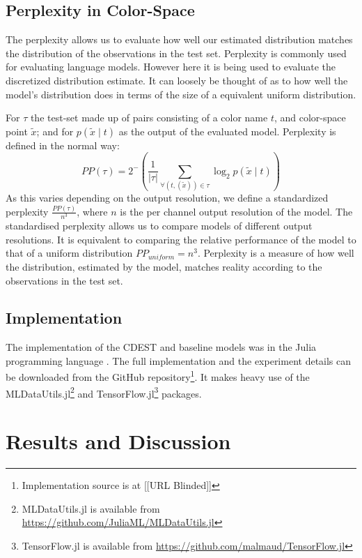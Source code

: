 \documentclass[11pt,a4paper]{article}
\newcommand{\parencite}{\citep}
\begin{document}
\subsection{Perplexity in Color-Space}
The perplexity allows us to evaluate how well our estimated distribution matches the distribution of the observations in the test set.
Perplexity is commonly used for evaluating language models. However here it is being used to evaluate the discretized distribution estimate.
It can loosely be thought of as to how well the model's distribution does in terms of the size of a equivalent uniform distribution.

For $\tau$ the test-set made up of pairs consisting of a color name $t$, and color-space point $\tilde{x}$;
and for $p(\tilde{x}\mid t)$ as the output of the evaluated model.
Perplexity is defined in the normal way:
\[
 PP(\tau) = 2^-{\left(
 	\frac{1}{|\tau|} 
 	\sum_{
	 		\forall(t,(\tilde{x})) \in \tau}
 	 \log_2 p(\tilde{x}\mid t)\right)}
\]
As this varies depending on the output resolution,
we define a standardized perplexity $\frac{PP(\tau)}{n^3}$, where $n$ is the per channel output resolution of the model.
The standardised perplexity allows us to compare models of different output resolutions.
It is equivalent to comparing the relative performance of the model to that of a uniform distribution $PP_{uniform}=n^3$.
Perplexity is a measure of how well the distribution, estimated by the model, matches reality according to the observations in the test set.

\subsection{Implementation}
The implementation of the CDEST and baseline models was in the Julia programming language \parencite{Julia}.
The full implementation and the experiment details can be downloaded from the GitHub repository\footnote{Implementation source is at %
[[URL Blinded]]}.
It makes heavy use of the MLDataUtils.jl\footnote{MLDataUtils.jl is available from \url{https://github.com/JuliaML/MLDataUtils.jl}} and TensorFlow.jl\footnote{TensorFlow.jl is available from \url{https://github.com/malmaud/TensorFlow.jl}} packages.


\section{Results and Discussion}\label{sec:results-and-discussion}
\end{document}
